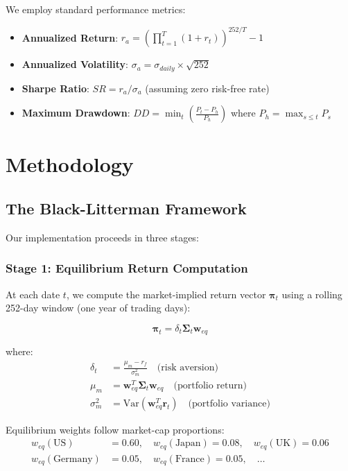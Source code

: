 \documentclass[12pt,a4paper]{article}
\begin{document}
We employ standard performance metrics:
\begin{itemize}
\item \textbf{Annualized Return}: $r_a = (\prod_{t=1}^T (1 + r_t))^{252/T} - 1$
\item \textbf{Annualized Volatility}: $\sigma_a = \sigma_{daily} \times \sqrt{252}$
\item \textbf{Sharpe Ratio}: $SR = r_a / \sigma_a$ (assuming zero risk-free rate)
\item \textbf{Maximum Drawdown}: $DD = \min_t \left(\frac{P_t - P_h}{P_h}\right)$ where $P_h = \max_{s \leq t} P_s$
\end{itemize}

\section{Methodology}

\subsection{The Black-Litterman Framework}

Our implementation proceeds in three stages:

\subsubsection{Stage 1: Equilibrium Return Computation}

At each date $t$, we compute the market-implied return vector $\boldsymbol{\pi}_t$ using a rolling 252-day window (one year of trading days):

\begin{equation}
\boldsymbol{\pi}_t = \delta_t \boldsymbol{\Sigma}_t \mathbf{w}_{eq}
\end{equation}

where:
\begin{align}
\delta_t &= \frac{\mu_m - r_f}{\sigma_m^2} \quad \text{(risk aversion)} \\
\mu_m &= \mathbf{w}_{eq}^T \boldsymbol{\Sigma}_t \mathbf{w}_{eq} \quad \text{(portfolio return)} \\
\sigma_m^2 &= \text{Var}(\mathbf{w}_{eq}^T \mathbf{r}_t) \quad \text{(portfolio variance)}
\end{align}

Equilibrium weights follow market-cap proportions:
\begin{align}
w_{eq}(\text{US}) &= 0.60, \quad w_{eq}(\text{Japan}) = 0.08, \quad w_{eq}(\text{UK}) = 0.06 \\
w_{eq}(\text{Germany}) &= 0.05, \quad w_{eq}(\text{France}) = 0.05, \quad \ldots
\end{align}
\end{document}
